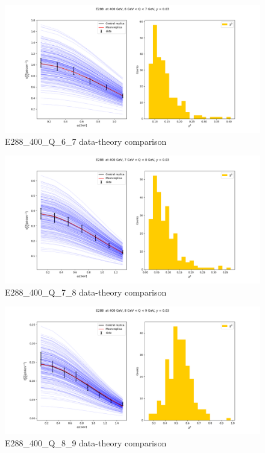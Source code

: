 \documentclass[
]{article}
\begin{document}
\begin{figure}
\centering
\includegraphics{pngplots/E288_400_Q_6_7.png}
\caption{E288\_400\_Q\_6\_7 data-theory comparison}
\end{figure}

\begin{figure}
\centering
\includegraphics{pngplots/E288_400_Q_7_8.png}
\caption{E288\_400\_Q\_7\_8 data-theory comparison}
\end{figure}

\begin{figure}
\centering
\includegraphics{pngplots/E288_400_Q_8_9.png}
\caption{E288\_400\_Q\_8\_9 data-theory comparison}
\end{figure}
\end{document}
